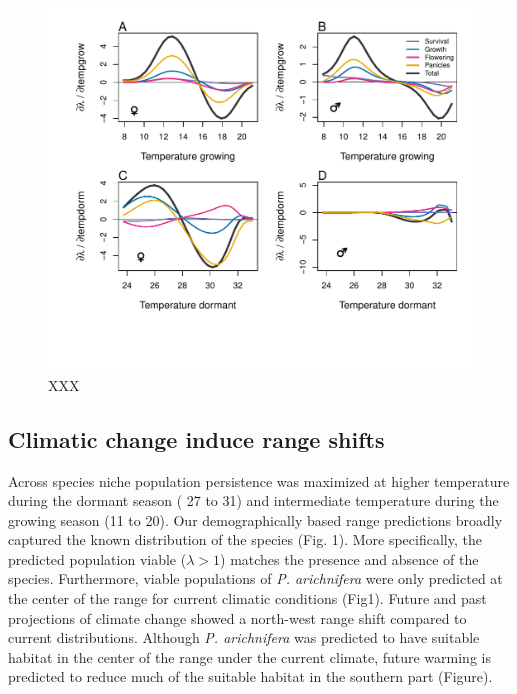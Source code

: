\documentclass[12pt]{article}
\begin{document}
\begin{figure}[H]
  \begin{center}
    \includegraphics[width=0.95\linewidth]{Figures/LTRE_Temperature.pdf}
  \caption{XXX}
  \label{fig:LTRETemp}
  \end{center}
\end{figure}


\subsection*{Climatic change induce range shifts}
Across species niche population persistence was maximized at higher temperature during the dormant season ( 27 to 31) and intermediate temperature during the growing season (11 to 20). 
Our demographically based range predictions broadly captured the known distribution of the species (Fig. 1). 
More specifically, the predicted population viable ($\lambda>1$) matches the presence and absence of the species. 
Furthermore, viable populations of \emph{P. arichnifera} were only predicted at the center of the range for current climatic conditions (Fig1).
Future and past projections of climate change showed a north-west range shift compared to current distributions. 
Although \emph{P. arichnifera} was predicted to have suitable habitat in the center of the range under the current climate, future warming is predicted to reduce much of the suitable habitat in the southern part (Figure). 
\end{document}
